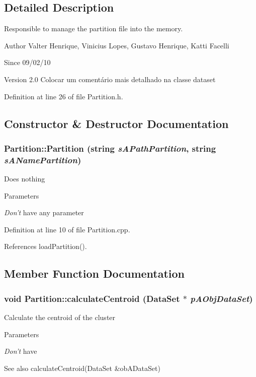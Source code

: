 \subsection{Detailed Description}
Responsible to manage the partition file into the memory. \begin{DoxyAuthor}{Author}
Valter Henrique, Vinicius Lopes, Gustavo Henrique, Katti Facelli 
\end{DoxyAuthor}
\begin{DoxySince}{Since}
09/02/10 
\end{DoxySince}
\begin{DoxyVersion}{Version}
2.0 Colocar um comentário mais detalhado na classe dataset 
\end{DoxyVersion}


Definition at line 26 of file Partition.h.

\subsection{Constructor \& Destructor Documentation}
\hypertarget{classPartition_a9700c1c87842936c22fd9a3dc41740e1}{
\subsubsection[{Partition}]{\setlength{\rightskip}{0pt plus 5cm}Partition::Partition (string {\em sAPathPartition}, \/  string {\em sANamePartition})}}
\label{classPartition_a9700c1c87842936c22fd9a3dc41740e1}
Does nothing 
\begin{DoxyParams}{Parameters}
\item[{\em Don't}]have any parameter \end{DoxyParams}


Definition at line 10 of file Partition.cpp.

References loadPartition().

\subsection{Member Function Documentation}
\hypertarget{classPartition_af9c0055c226e56ff0d02c935fc885b7b}{
\subsubsection[{calculateCentroid}]{\setlength{\rightskip}{0pt plus 5cm}void Partition::calculateCentroid ({\bf DataSet} $\ast$ {\em pAObjDataSet})}}
\label{classPartition_af9c0055c226e56ff0d02c935fc885b7b}
Calculate the centroid of the cluster 
\begin{DoxyParams}{Parameters}
\item[{\em Don't}]have \end{DoxyParams}
\begin{DoxySeeAlso}{See also}
calculateCentroid(DataSet \&obADataSet) 
\end{DoxySeeAlso}


